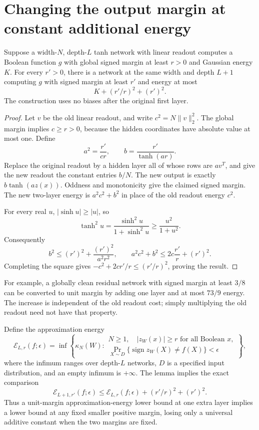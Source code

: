 \section{Changing the output margin at constant additional energy}
\label{sec:margin-transfer}

\begin{lemma}
\label{lem:one-layer-margin-transfer}
Suppose a width-$N$, depth-$L$ tanh network with linear readout computes
a Boolean function $g$ with global signed margin at least $r>0$ and
Gaussian energy $K$. For every $r'>0$, there is a network at the same
width and depth $L+1$ computing $g$ with signed margin at least $r'$ and
energy at most
\[
 K+(r'/r)^2+(r')^2.
\]
The construction uses no biases after the original first layer.
\end{lemma}

\begin{proof}
Let $v$ be the old linear readout, and write
$c^2=N\|v\|_2^2$. The global margin implies $c\ge r>0$, because the
hidden coordinates have absolute value at most one. Define
\[
 a^2=\frac{r'}{cr},\qquad b=\frac{r'}{\tanh(ar)}.
\]
Replace the original readout by a hidden layer all of whose rows are
$av^T$, and give the new readout the constant entries $b/N$. The new
output is exactly $b\tanh(az(x))$. Oddness and monotonicity give the
claimed signed margin. The new two-layer energy is $a^2c^2+b^2$ in
place of the old readout energy $c^2$.

For every real $u$, $|\sinh u|\ge |u|$, so
\[
 \tanh^2u=\frac{\sinh^2u}{1+\sinh^2u}
       \ge\frac{u^2}{1+u^2}.
\]
Consequently
\[
 b^2\le(r')^2+\frac{(r')^2}{a^2r^2},\qquad
 a^2c^2+b^2\le 2c\frac{r'}r+(r')^2.
\]
Completing the square gives
$-c^2+2cr'/r\le(r'/r)^2$, proving the result.
\end{proof}

For example, a globally clean residual network with signed margin at
least $3/8$ can be converted to unit margin by adding one layer and at
most $73/9$ energy. The increase is independent of the old readout cost;
simply multiplying the old readout need not have that property.

Define the approximation energy
\[
 \mathcal E_{L,r}(f;\epsilon)
 =\inf\left\{\kappa_N(W):\begin{array}{l}
 N\ge1,\quad |z_W(x)|\ge r\text{ for all Boolean }x,\\
 \Pr_{X\sim D}\{\operatorname{sign}z_W(X)\ne f(X)\}<\epsilon
 \end{array}\right\},
\]
where the infimum ranges over depth-$L$ networks, $D$ is a specified
input distribution, and an empty infimum is
$+\infty$. The lemma implies the exact comparison
\[
 \mathcal E_{L+1,r'}(f;\epsilon)
 \le \mathcal E_{L,r}(f;\epsilon)+(r'/r)^2+(r')^2.
\]
Thus a unit-margin approximation-energy lower bound at one extra layer
implies a lower bound at any fixed smaller positive margin, losing only
a universal additive constant when the two margins are fixed.
